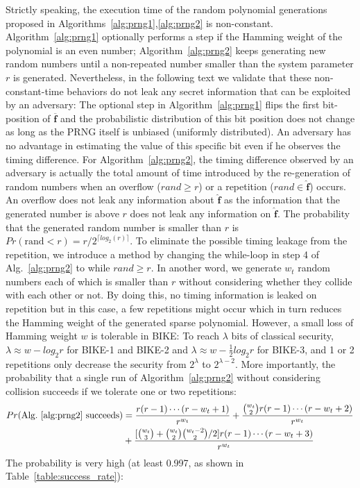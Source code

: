 \documentclass[runningheads]{llncs}
\begin{document}
Strictly speaking, the execution time of the random polynomial generations proposed in
Algorithms~\ref{alg:prng1},\ref{alg:prng2} is non-constant.
Algorithm~\ref{alg:prng1} optionally performs a step if the
Hamming weight of the polynomial is an even number;
Algorithm~\ref{alg:prng2} keeps generating new random numbers
until a non-repeated number smaller than the system parameter $r$
is generated.
Nevertheless, in the following text we validate that
these non-constant-time behaviors do not leak any secret
information that can be exploited by an adversary:
The optional step in Algorithm~\ref{alg:prng1}
flips the first bit-position of $\mathbf{\overline{f}}$
and the probabilistic distribution of this bit position
does not change as long as the PRNG itself is unbiased (uniformly distributed).
An adversary has no advantage in estimating the value
of this specific bit even if he observes the timing difference.
For Algorithm~\ref{alg:prng2}, the timing difference
observed by an adversary is actually the total amount
of time introduced by the re-generation of random numbers
when an overflow ($rand\geq r$) or a repetition ($rand\in \mathbf{\hat{f}}$) occurs.
An overflow does not leak any information about $\mathbf{\hat{f}}$
as the information that the generated number is above $r$ does
not leak any information on $\mathbf{\hat{f}}$.
The probability that the generated random number is smaller
than $r$ is $Pr(\text{rand} < r)= r/2^{\lceil log_2(r)\rceil}$.
To eliminate the possible timing leakage from the repetition,
we introduce a method by changing the while-loop
in step 4 of Alg.~\ref{alg:prng2} to while $rand\geq r$.
In another word, we generate $w_t$ random numbers each
of which is smaller than $r$ without considering whether they collide
with each other or not.
By doing this, no timing information is leaked on repetition but
in this case, a few repetitions might occur which in turn reduces
the Hamming weight of the generated sparse polynomial.
However, a small loss of Hamming weight $w$ is tolerable in BIKE:
To reach $\lambda$ bits of classical security, $\lambda\approx w-log_2r$ for
BIKE-1 and BIKE-2 and $\lambda\approx w-\frac{1}{2}log_2r$ for BIKE-3,
and 1 or 2 repetitions only decrease the security from $2^\lambda$ to $2^{\lambda-2}$.
More importantly, the probability that a single run of Algorithm~\ref{alg:prng2} without considering collision succeeds if we tolerate one or two repetitions:
\begin{align}
    Pr(\text{Alg.~\ref{alg:prng2} succeeds})
    &=\frac{r(r-1)\cdots (r-w_t+1)}{r^{w_t}}+ \frac{\binom{w_t}{2}r(r-1)\cdots (r-w_t+2)}{r^{w_t}}\\
    &+ \frac{[\binom{w_t}{3}+\binom{w_t}{2}\binom{w_t-2}{2}/2]  r(r-1)\cdots (r-w_t+3) }{r^{w_t}}
\end{align}
The probability is very high (at least 0.997, as shown in Table~\ref{table:success_rate}):
\end{document}
